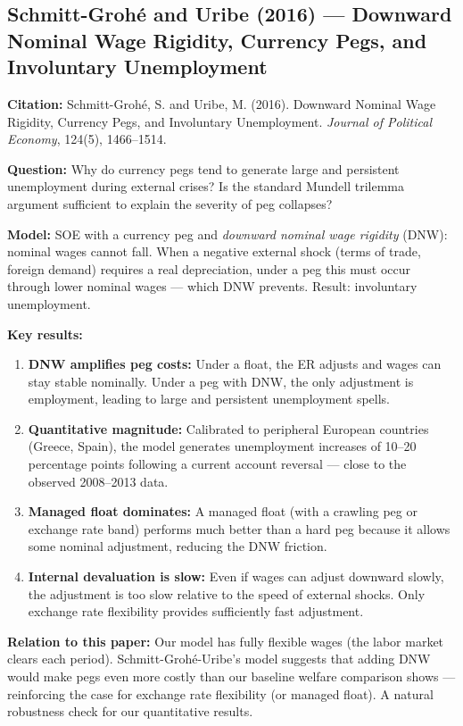 \documentclass[12pt]{article}
\begin{document}
\subsection{Schmitt-Grohé and Uribe (2016) --- Downward Nominal Wage Rigidity, Currency Pegs, and Involuntary Unemployment}

\textbf{Citation:} Schmitt-Grohé, S. and Uribe, M. (2016). Downward Nominal Wage Rigidity, Currency Pegs, and Involuntary Unemployment. \textit{Journal of Political Economy}, 124(5), 1466--1514.

\textbf{Question:} Why do currency pegs tend to generate large and persistent unemployment during external crises? Is the standard Mundell trilemma argument sufficient to explain the severity of peg collapses?

\textbf{Model:} SOE with a currency peg and \textit{downward nominal wage rigidity} (DNW): nominal wages cannot fall. When a negative external shock (terms of trade, foreign demand) requires a real depreciation, under a peg this must occur through lower nominal wages --- which DNW prevents. Result: involuntary unemployment.

\textbf{Key results:}
\begin{enumerate}
    \item \textbf{DNW amplifies peg costs:} Under a float, the ER adjusts and wages can stay stable nominally. Under a peg with DNW, the only adjustment is employment, leading to large and persistent unemployment spells.
    \item \textbf{Quantitative magnitude:} Calibrated to peripheral European countries (Greece, Spain), the model generates unemployment increases of 10--20 percentage points following a current account reversal --- close to the observed 2008--2013 data.
    \item \textbf{Managed float dominates:} A managed float (with a crawling peg or exchange rate band) performs much better than a hard peg because it allows some nominal adjustment, reducing the DNW friction.
    \item \textbf{Internal devaluation is slow:} Even if wages can adjust downward slowly, the adjustment is too slow relative to the speed of external shocks. Only exchange rate flexibility provides sufficiently fast adjustment.
\end{enumerate}

\textbf{Relation to this paper:} Our model has fully flexible wages (the labor market clears each period). Schmitt-Grohé-Uribe's model suggests that adding DNW would make pegs even more costly than our baseline welfare comparison shows --- reinforcing the case for exchange rate flexibility (or managed float). A natural robustness check for our quantitative results.
\end{document}
